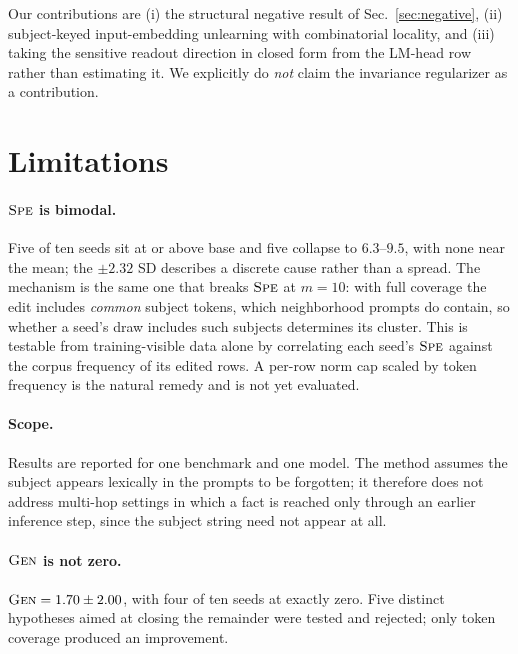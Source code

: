 \documentclass[11pt]{article}
\newcommand{\Gen}{\textsc{Gen}}
\newcommand{\Spe}{\textsc{Spe}}
\begin{document}
\noindent
Our contributions are (i) the structural negative result of
Sec.~\ref{sec:negative}, (ii) subject-keyed input-embedding unlearning with
combinatorial locality, and (iii) taking the sensitive readout direction in
closed form from the LM-head row rather than estimating it. We explicitly do
\emph{not} claim the invariance regularizer as a contribution.

\section{Limitations}

\paragraph{$\Spe$ is bimodal.} Five of ten seeds sit at or above base and five
collapse to $6.3$--$9.5$, with none near the mean; the $\pm 2.32$ SD describes
a discrete cause rather than a spread. The mechanism is the same one that
breaks $\Spe$ at $m = 10$: with full coverage the edit includes \emph{common}
subject tokens, which neighborhood prompts do contain, so whether a seed's
draw includes such subjects determines its cluster. This is testable from
training-visible data alone by correlating each seed's $\Spe$ against the
corpus frequency of its edited rows. A per-row norm cap scaled by token
frequency is the natural remedy and is not yet evaluated.

\paragraph{Scope.} Results are reported for one benchmark and one model. The
method assumes the subject appears lexically in the prompts to be forgotten; it
therefore does not address multi-hop settings in which a fact is reached only
through an earlier inference step, since the subject string need not appear at
all.

\paragraph{$\Gen$ is not zero.} $\Gen = 1.70 \pm 2.00$, with four of ten seeds
at exactly zero. Five distinct hypotheses aimed at closing the remainder were
tested and rejected; only token coverage produced an improvement.


\appendix
\end{document}
